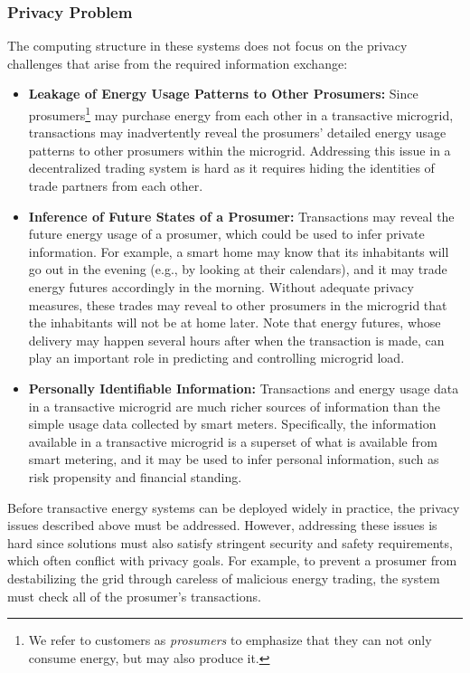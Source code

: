 \documentclass[12pt,letterpaper]{article}
\begin{document}
\subsubsection{Privacy Problem}

The computing structure in these systems does not focus on the privacy challenges that arise from the
required information exchange:
\begin{itemize}
\item \textbf{Leakage of Energy Usage Patterns to Other Prosumers:} 
 Since prosumers\footnote{We
  refer to customers as \emph{prosumers} to emphasize that they can
  not only consume energy, but may also produce it.} may purchase
  energy from each other in a transactive microgrid, transactions may
  inadvertently reveal the prosumers' detailed energy usage patterns
  to other prosumers within the microgrid.  Addressing this issue in a
  decentralized trading system is hard as it requires hiding the
  identities of trade partners from each other. %

\item \textbf{Inference of Future States of a Prosumer:} 
  Transactions may reveal
  the future energy usage of a prosumer, which could be used to infer
  private information.  For example, a smart home may know that its
  inhabitants will go out in the evening (e.g., by looking at
  their calendars), and it may trade energy futures accordingly in the
  morning.  Without adequate privacy measures, these trades may reveal
  to other prosumers in the microgrid that the inhabitants will not be
  at home later.  Note that energy
  futures, whose delivery may happen several hours after when the
  transaction is made, can play an important role in predicting and
  controlling microgrid load.  %

\item \textbf{Personally Identifiable Information:} 
  Transactions and energy
  usage data in a transactive microgrid are much richer sources of
  information than the simple usage data collected by smart
  meters.  Specifically, the information available in a
  transactive microgrid is a superset of what is available from smart
  metering, and it may be used to infer personal information, such as
  risk propensity and financial standing.
\end{itemize}

Before transactive energy systems can be deployed widely in practice,
the privacy issues described above must be addressed. However, addressing these
issues is hard since solutions must also satisfy stringent security
and safety requirements, which often conflict with privacy goals.  For
example, to prevent a prosumer from destabilizing the grid through
careless of malicious energy trading, the system must check all of the
prosumer's transactions.  
\end{document}
